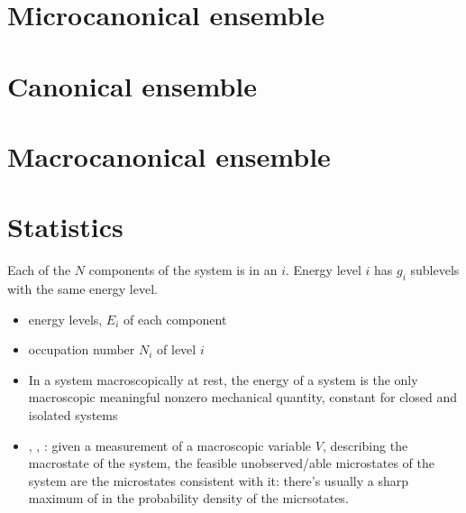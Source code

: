 \documentclass[letterpaper,10pt,english]{jupyterBook}
\begin{document}
\section{Microcanonical ensemble}
\label{\detokenize{ch/statistical-mechanics/notes:microcanonical-ensemble}}\label{\detokenize{ch/statistical-mechanics/notes:id1}}

\section{Canonical ensemble}
\label{\detokenize{ch/statistical-mechanics/notes:canonical-ensemble}}\label{\detokenize{ch/statistical-mechanics/notes:id2}}

\section{Macrocanonical ensemble}
\label{\detokenize{ch/statistical-mechanics/notes:macrocanonical-ensemble}}\label{\detokenize{ch/statistical-mechanics/notes:id3}}

\section{Statistics}
\label{\detokenize{ch/statistical-mechanics/notes:statistics}}\label{\detokenize{ch/statistical-mechanics/notes:statistical-mechanics-notes-distributions}}
\sphinxAtStartPar
Each of the \(N\) components of the system is in an  \(i\). Energy level \(i\) has \(g_i\) sublevels with the same energy level.
\begin{itemize}
\item {} 
\sphinxAtStartPar
energy levels, \(E_i\) of each component

\item {} 
\sphinxAtStartPar
occupation number \(N_i\) of level \(i\)

\item {} 
\sphinxAtStartPar
{} In a system macroscopically at rest, the energy of a system is the only macroscopic meaningful non\sphinxhyphen{}zero mechanical quantity, constant for closed and isolated systems

\item {} 
\sphinxAtStartPar
{}, , : given a measurement of a macroscopic variable \(V\), describing the macrostate of the system, the feasible un\sphinxhyphen{}observed/able microstates of the system are the microstates consistent with it: there’s usually a sharp maximum of in the probability density of the micrsotates.

\end{itemize}
\end{document}
